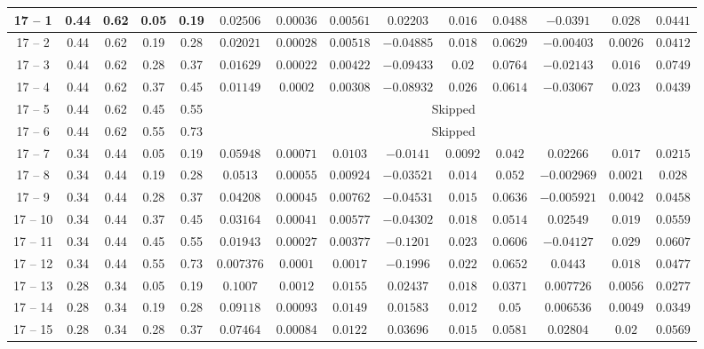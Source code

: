 \begin{longtable}{|*{14}{c|}}
\hline
17 -- 1 & 0.44 & 0.62 & 0.05 & 0.19 & $0.02506$ & $0.00036$ & $0.00561$ & $0.02203$ & $0.016$ & $0.0488$ & $-0.0391$ & $0.028$ & $0.0441$ \\
\hline
17 -- 2 & 0.44 & 0.62 & 0.19 & 0.28 & $0.02021$ & $0.00028$ & $0.00518$ & $-0.04885$ & $0.018$ & $0.0629$ & $-0.00403$ & $0.0026$ & $0.0412$ \\
\hline
17 -- 3 & 0.44 & 0.62 & 0.28 & 0.37 & $0.01629$ & $0.00022$ & $0.00422$ & $-0.09433$ & $0.02$ & $0.0764$ & $-0.02143$ & $0.016$ & $0.0749$ \\
\hline
17 -- 4 & 0.44 & 0.62 & 0.37 & 0.45 & $0.01149$ & $0.0002$ & $0.00308$ & $-0.08932$ & $0.026$ & $0.0614$ & $-0.03067$ & $0.023$ & $0.0439$ \\
\hline
17 -- 5 & 0.44 & 0.62 & 0.45 & 0.55 & \multicolumn{9}{c|}{Skipped} \\
\hline
17 -- 6 & 0.44 & 0.62 & 0.55 & 0.73 & \multicolumn{9}{c|}{Skipped} \\
\hline
17 -- 7 & 0.34 & 0.44 & 0.05 & 0.19 & $0.05948$ & $0.00071$ & $0.0103$ & $-0.0141$ & $0.0092$ & $0.042$ & $0.02266$ & $0.017$ & $0.0215$ \\
\hline
17 -- 8 & 0.34 & 0.44 & 0.19 & 0.28 & $0.0513$ & $0.00055$ & $0.00924$ & $-0.03521$ & $0.014$ & $0.052$ & $-0.002969$ & $0.0021$ & $0.028$ \\
\hline
17 -- 9 & 0.34 & 0.44 & 0.28 & 0.37 & $0.04208$ & $0.00045$ & $0.00762$ & $-0.04531$ & $0.015$ & $0.0636$ & $-0.005921$ & $0.0042$ & $0.0458$ \\
\hline
17 -- 10 & 0.34 & 0.44 & 0.37 & 0.45 & $0.03164$ & $0.00041$ & $0.00577$ & $-0.04302$ & $0.018$ & $0.0514$ & $0.02549$ & $0.019$ & $0.0559$ \\
\hline
17 -- 11 & 0.34 & 0.44 & 0.45 & 0.55 & $0.01943$ & $0.00027$ & $0.00377$ & $-0.1201$ & $0.023$ & $0.0606$ & $-0.04127$ & $0.029$ & $0.0607$ \\
\hline
17 -- 12 & 0.34 & 0.44 & 0.55 & 0.73 & $0.007376$ & $0.0001$ & $0.0017$ & $-0.1996$ & $0.022$ & $0.0652$ & $0.0443$ & $0.018$ & $0.0477$ \\
\hline
17 -- 13 & 0.28 & 0.34 & 0.05 & 0.19 & $0.1007$ & $0.0012$ & $0.0155$ & $0.02437$ & $0.018$ & $0.0371$ & $0.007726$ & $0.0056$ & $0.0277$ \\
\hline
17 -- 14 & 0.28 & 0.34 & 0.19 & 0.28 & $0.09118$ & $0.00093$ & $0.0149$ & $0.01583$ & $0.012$ & $0.05$ & $0.006536$ & $0.0049$ & $0.0349$ \\
\hline
17 -- 15 & 0.28 & 0.34 & 0.28 & 0.37 & $0.07464$ & $0.00084$ & $0.0122$ & $0.03696$ & $0.015$ & $0.0581$ & $0.02804$ & $0.02$ & $0.0569$ \\

\end{longtable}
